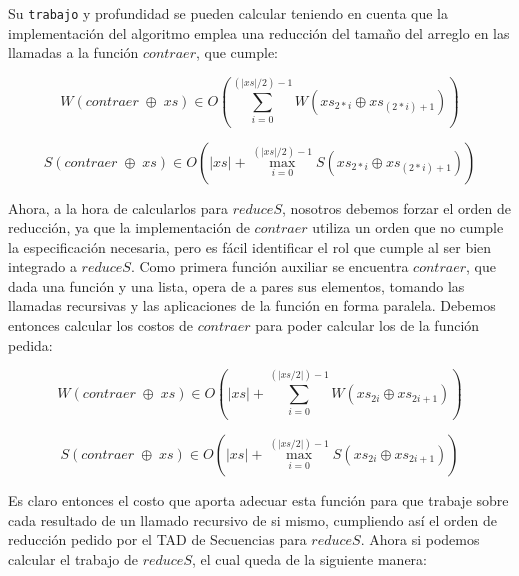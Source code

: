 \documentclass[a4paper,10pt]{article}
\begin{document}
    Su \texttt{trabajo} y profundidad se pueden calcular teniendo en cuenta 
que la implementación del algoritmo emplea una reducción del tamaño del 
arreglo en las llamadas a la función $contraer$, que cumple:

\begin{equation*}
    W \left( contraer\; \oplus \;xs \right) \in
    O \left( \sum_{i=0}^{(\vert xs \vert /2 )-1} W \left( xs_{2*i} \oplus xs_{(2*i) +1} \right) \right)
\end{equation*}

\begin{equation*}
    S \left( contraer\; \oplus \;xs \right) \in
    O \left( \vert xs \vert + \max_{i=0}^{(\vert xs \vert /2 )-1} S \left( xs_{2*i} \oplus xs_{(2*i) +1} \right) \right)
\end{equation*}

\smallskip

    Ahora, a la hora de calcularlos para $reduceS$, nosotros debemos forzar
el orden de reducción, ya que la implementación de $contraer$ utiliza un orden
que no cumple la especificación necesaria, pero es fácil identificar el rol que
cumple al ser bien integrado a $reduceS$. 
    Como primera función auxiliar se encuentra $contraer$, que dada una función y
una lista, opera de a pares sus elementos, tomando las llamadas recursivas y las 
aplicaciones de la función en forma paralela. Debemos entonces calcular los costos
de $contraer$ para poder calcular los de la función pedida:

\begin{equation*}
    W \left( contraer \;\oplus \;xs \right) \in
    O \left( \vert xs \vert + \sum_{i=0}^{(\vert xs / 2 \vert) - 1} W \left( xs_{2i} \oplus xs_{2i+1} \right) \right)
\end{equation*}

\begin{equation*}
    S \left( contraer \;\oplus \;xs \right) \in
    O \left( \vert xs \vert + \max_{i=0}^{(\vert xs / 2 \vert) - 1} S \left( xs_{2i} \oplus xs_{2i+1} \right) \right)
\end{equation*}

\smallskip

    Es claro entonces el costo que aporta adecuar esta función para que trabaje sobre
cada resultado de un llamado recursivo de si mismo, cumpliendo así el orden de
reducción pedido por el TAD de Secuencias para $reduceS$.
Ahora si podemos calcular el trabajo de $reduceS$, el cual queda de la siguiente
manera: 
\end{document}
